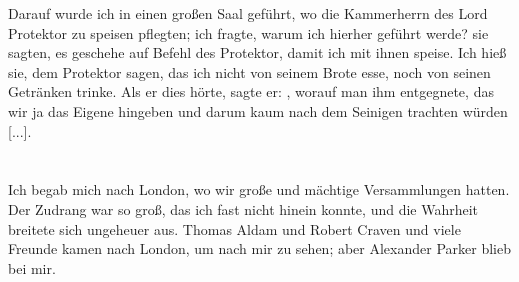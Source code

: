 Darauf wurde ich in einen großen Saal geführt, wo
die Kammerherrn des Lord Protektor zu speisen pflegten; ich fragte,
warum ich hierher geführt werde? sie sagten, es geschehe auf
Befehl des Protektor, damit ich mit ihnen speise. Ich hieß sie,
dem Protektor sagen, das ich nicht von seinem Brote esse, noch
von seinen Getränken trinke. 
Als er dies hörte, sagte er: , worauf man 
ihm entgegnete, das wir
ja das Eigene hingeben und darum kaum nach dem Seinigen
trachten würden [...].

\section{}

Ich begab mich nach London, wo wir große und mächtige
Versammlungen hatten. Der Zudrang war so groß, das ich fast
nicht hinein konnte, 
und die Wahrheit breitete sich ungeheuer aus.
Thomas Aldam und Robert 
Craven und viele Freunde kamen
nach London, um nach mir zu sehen; aber 
Alexander Parker blieb bei mir.

